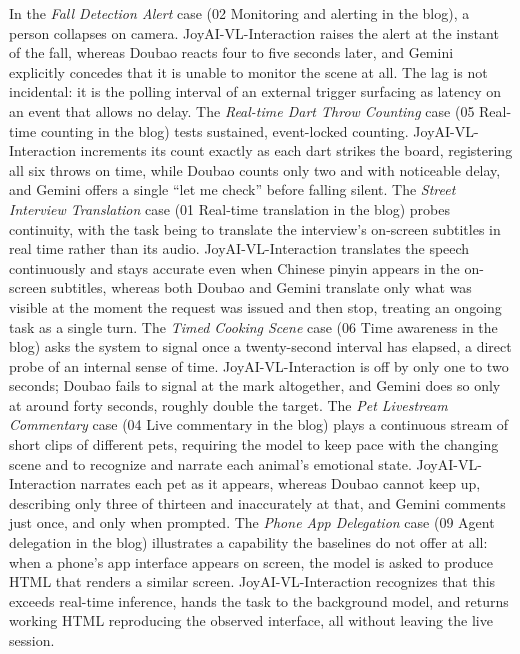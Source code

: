 \documentclass{llmxive}
\begin{document}
In the \textit{Fall Detection Alert} case (02 Monitoring and alerting in the blog), a person collapses on camera. JoyAI-VL-Interaction raises the alert at the instant of the fall, whereas Doubao reacts four to five seconds later, and Gemini explicitly concedes that it is unable to monitor the scene at all. The lag is not incidental: it is the polling interval of an external trigger surfacing as latency on an event that allows no delay.
The \textit{Real-time Dart Throw Counting} case (05 Real-time counting in the blog) tests sustained, event-locked counting. JoyAI-VL-Interaction increments its count exactly as each dart strikes the board, registering all six throws on time, while Doubao counts only two and with noticeable delay, and Gemini offers a single ``let me check'' before falling silent.
The \textit{Street Interview Translation} case (01 Real-time translation in the blog) probes continuity, with the task being to translate the interview's on-screen subtitles in real time rather than its audio. JoyAI-VL-Interaction translates the speech continuously and stays accurate even when Chinese pinyin appears in the on-screen subtitles, whereas both Doubao and Gemini translate only what was visible at the moment the request was issued and then stop, treating an ongoing task as a single turn.
The \textit{Timed Cooking Scene} case (06 Time awareness in the blog) asks the system to signal once a twenty-second interval has elapsed, a direct probe of an internal sense of time. JoyAI-VL-Interaction is off by only one to two seconds; Doubao fails to signal at the mark altogether, and Gemini does so only at around forty seconds, roughly double the target.
The \textit{Pet Livestream Commentary} case (04 Live commentary in the blog) plays a continuous stream of short clips of different pets, requiring the model to keep pace with the changing scene and to recognize and narrate each animal's emotional state. JoyAI-VL-Interaction narrates each pet as it appears, whereas Doubao cannot keep up, describing only three of thirteen and inaccurately at that, and Gemini comments just once, and only when prompted.
The \textit{Phone App Delegation} case (09 Agent delegation in the blog) illustrates a capability the baselines do not offer at all: when a phone's app interface appears on screen, the model is asked to produce HTML that renders a similar screen. JoyAI-VL-Interaction recognizes that this exceeds real-time inference, hands the task to the background model, and returns working HTML reproducing the observed interface, all without leaving the live session.
\end{document}
